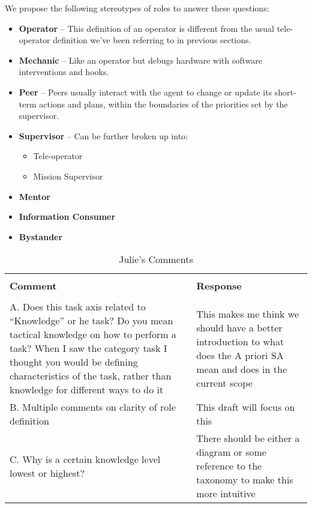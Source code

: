 \documentclass[letterpaper, 10 pt, conference]{ieeeconf} %
\begin{document}
We propose the following stereotypes of roles to answer these questions:
\begin{itemize}{}
  \item \textbf{Operator} -- This definition of an operator is different from
    the usual tele-operator definition we've been referring to in previous sections.
  \item \textbf{Mechanic} -- Like an operator but debugs hardware with software
    interventions and hooks.
  \item \textbf{Peer} -- Peers usually interact with the agent to change or
    update its short-term actions and plans, within the boundaries of the
    priorities set by the supervisor.
  \item \textbf{Supervisor} -- Can be further broken up into:
    \begin{itemize}{}
      \item Tele-operator
      \item Mission Supervisor
    \end{itemize}
  \item \textbf{Mentor}
  \item \textbf{Information Consumer}
  \item \textbf{Bystander}

\end{itemize}

\begin{table*}
  \caption{Julie's Comments}
  \begin{tabular}{p{8cm} | p{8cm}}
    \hline \\
    \textbf{Comment} & \textbf{Response} \\
    \hline \\
    A. Does this task axis related to ``Knowledge'' or he task? Do you mean tactical knowledge on how to
    perform a task? When I saw the category task I thought you would be defining characteristics of
    the task, rather than knowledge for different ways to do it & This makes me think we should
                                                                  have a better introduction to what does the A priori SA mean and does in the current scope \\
    B. Multiple comments on clarity of role definition & This draft will focus on this \\
    C. Why is a certain knowledge level lowest or highest? & There should be either a diagram or some
                                                             reference to the taxonomy to make this more intuitive \\
    \hline
  \end{tabular}
\end{table*}


\end{document}
